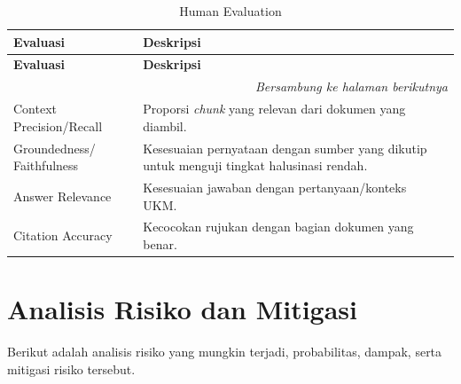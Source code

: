 \begin{longtable}{|p{5cm}|p{7cm}|p{5cm}|}
\caption{Human Evaluation}
\label{tbl:Human Evaluation} \\
\hline
\textbf{Evaluasi} &  \textbf{Deskripsi}\\
\hline
\endfirsthead

\hline
\textbf{Evaluasi} &  \textbf{Deskripsi}\\
\hline
\endhead

\hline
\multicolumn{3}{r}{\textit{Bersambung ke halaman berikutnya}} \\
\endfoot

\hline
\endlastfoot
Context Precision/Recall
&
Proporsi \textit{chunk} yang relevan dari dokumen yang diambil.
\\ \hline

Groundedness/ Faithfulness
&
Kesesuaian pernyataan dengan sumber yang dikutip untuk menguji tingkat halusinasi rendah.
\\ \hline

Answer Relevance
&
Kesesuaian jawaban dengan pertanyaan/konteks UKM.
\\ \hline

Citation Accuracy
&
Kecocokan rujukan dengan bagian dokumen yang benar.
\\ \hline
\end{longtable}

\section{Analisis Risiko dan Mitigasi}

Berikut adalah analisis risiko yang mungkin terjadi, probabilitas, dampak, serta mitigasi risiko tersebut.

